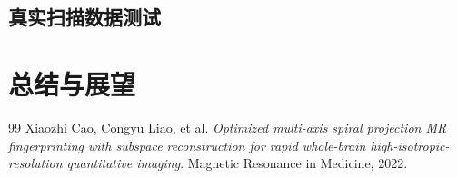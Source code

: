 \documentclass[a4paper, 11pt]{ctexart}
\begin{document}
\subsection{真实扫描数据测试}

\section{总结与展望}

\newpage
\begin{thebibliography}{99}
Xiaozhi Cao, Congyu Liao, et al. \textit{Optimized multi-axis spiral projection MR fingerprinting with subspace reconstruction for rapid whole-brain high-isotropic-resolution quantitative imaging}. Magnetic Resonance in Medicine, 2022.
\end{thebibliography}
\end{document}
